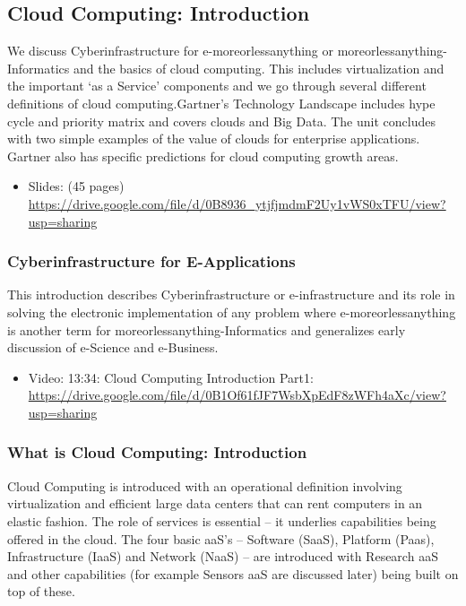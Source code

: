\subsection{Cloud Computing: Introduction}

We discuss Cyberinfrastructure for e-moreorlessanything or
moreorlessanything-Informatics and the basics of cloud computing. This
includes virtualization and the important `as a Service' components and
we go through several different definitions of cloud computing.Gartner's
Technology Landscape includes hype cycle and priority matrix and covers
clouds and Big Data. The unit concludes with two simple examples of the
value of clouds for enterprise applications. Gartner also has specific
predictions for cloud computing growth areas.

\begin{itemize}
\tightlist
\item
  Slides: (45 pages)
  \url{https://drive.google.com/file/d/0B8936_ytjfjmdmF2Uy1vWS0xTFU/view?usp=sharing}
\end{itemize}

\subsubsection{Cyberinfrastructure for E-Applications}

This introduction describes Cyberinfrastructure or e-infrastructure and
its role in solving the electronic implementation of any problem where
e-moreorlessanything is another term for moreorlessanything-Informatics
and generalizes early discussion of e-Science and e-Business.

\begin{itemize}
\tightlist
\item
  Video: 13:34: Cloud Computing Introduction Part1:
  \url{https://drive.google.com/file/d/0B1Of61fJF7WsbXpEdF8zWFh4aXc/view?usp=sharing}
\end{itemize}

\subsubsection{What is Cloud Computing: Introduction}

Cloud Computing is introduced with an operational definition involving
virtualization and efficient large data centers that can rent computers
in an elastic fashion. The role of services is essential -- it underlies
capabilities being offered in the cloud. The four basic aaS's --
Software (SaaS), Platform (Paas), Infrastructure (IaaS) and Network
(NaaS) -- are introduced with Research aaS and other capabilities (for
example Sensors aaS are discussed later) being built on top of these.

